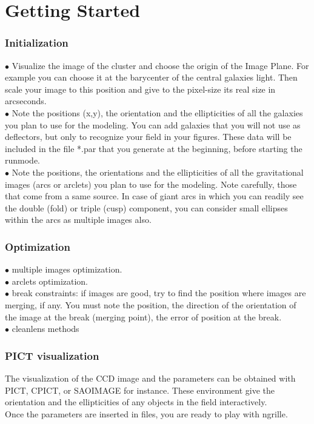 
\parindent0pt
\chapter{Getting Started}

\subsection*{Initialization}

$\bullet$ Visualize the image of the cluster and choose the origin of the
Image Plane. For example you can choose it at the barycenter of the
central galaxies light. Then scale your image to this position and give
to the pixel-size its real size in arcseconds. \\

$\bullet$ Note the positions (x,y),
the orientation and the ellipticities of all the galaxies you plan to
use for the modeling. You can add galaxies that you will not use as
deflectors, but only to recognize your field in your figures. These data
will be included in the file *.par that you generate at the beginning,
before starting the runmode. \\

$\bullet$ Note the positions, the orientations and the ellipticities of
all the gravitational images (arcs or arclets) you plan to use for the
modeling. Note carefully, those that come from a same source. In case of
giant arcs in which you can readily see the double (fold) or triple
(cusp) component, you can consider small ellipses within the arcs as
multiple images also. \\

\subsection*{Optimization}

$\bullet$ multiple images optimization.\\

$\bullet$ arclets optimization.\\

$\bullet$ break constraints: if images are good,
try to find the position where images are
merging, if any. You  must note the position, the direction of the
orientation of the image at the break (merging point), the error of
position at the break.\\

$\bullet$ cleanlens methods\\

\subsection*{PICT visualization}

The visualization of the CCD image and the parameters can be obtained
with PICT, CPICT, or SAOIMAGE for instance. These environment give the
orientation and the ellipticities of any objects in the field
interactively.\\


Once the parameters are inserted in files, you are ready to play with
ngrille.\\



